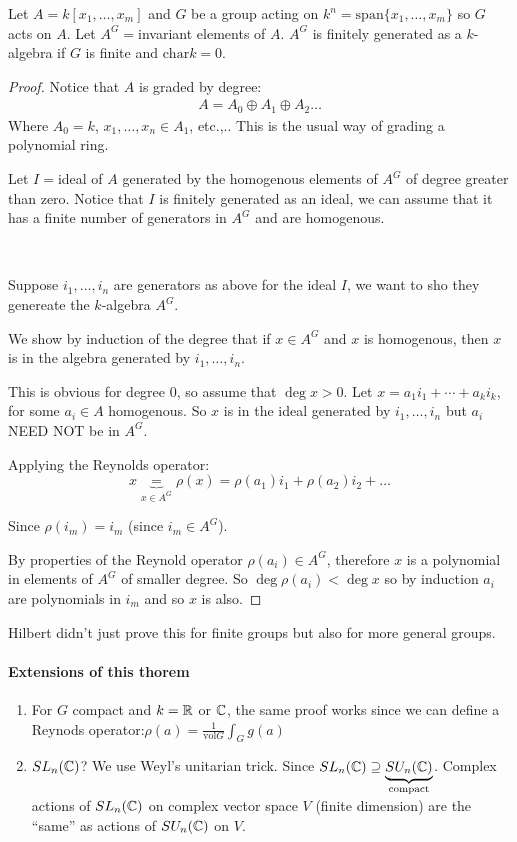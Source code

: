 \begin{theorem}
    Let $A = k[x_1,\dots,x_m]$ and $G$ be a group acting on $k^n =\text{span}\{x_1,\dots,x_m\}$ so $G$ acts on $A$. Let $A^G = $invariant elements of $A$.
    $A^G$ is finitely generated as a $k$-algebra if $G$ is finite and $\text{char} k = 0$.
    
    \begin{proof}
        Notice that $A$ is graded by degree:\begin{eqnarray}
            A = A_0\oplus A_1\oplus A_2\dots
        \end{eqnarray}
        Where $A_0 = k$, $x_1,\dots,x_n\in A_1$, etc.,.. This is the usual way of grading a polynomial ring.

        Let $I = $ideal of $A$ generated by the homogenous elements of $A^G$ of degree greater than zero. Notice that $I$ is finitely generated as an ideal, we can assume that it has a finite number of generators in $A^G$ and are homogenous.

        \

        Suppose $i_1,\dots,i_n$ are generators as above for the ideal $I$, we want to sho they genereate the $k$-algebra $A^G$. 

        We show by induction of the degree that if $x\in A^G$ and $x$ is homogenous, then $x$ is in the algebra generated by $i_1,\dots,i_n$. 
        
        This is obvious for degree $0$, so assume that $\deg x>0$. Let $x=a_1i_1+\cdots+{a_k}{i_k}$, for some $a_i\in A$ homogenous. So $x$ is in the ideal generated by $i_1,\ldots,i_n$ but $a_i$ NEED NOT be in $A^G$.

        Applying the Reynolds operator:\[x \underbrace{=}_{x\in A^G} \rho(x) = \rho(a_1)i_1+\rho(a_2)i_2+\ldots\] 
        
        Since $\rho(i_m) = i_m$ (since $i_m\in A^G$).
        


        By properties of the Reynold operator $\rho(a_i)\in A^G$, therefore $x$ is a polynomial in elements of $A^G$ of smaller degree. So $\deg \rho(a_i)<\deg x$ so by induction $a_i$ are polynomials in $i_m$ and so $x$ is also.
    \end{proof}
\end{theorem}

Hilbert didn't just prove this for finite groups but also for more general groups.

\paragraph*{Extensions of this thorem}\begin{enumerate}
    \item For $G$ compact and $k=\mathbb{R}$ or $\mathbb{C}$, the same proof works since we can define a Reynods operator:$\rho(a) = \frac{1}{\text{vol}G}\int_Gg(a)$
    \item $SL_n(\mathbb{C})$? We use Weyl's unitarian trick. Since $SL_n(\mathbb{C})\supseteq \underbrace{SU_n(\mathbb{C})}_{\text{compact}}$. Complex actions of $SL_n(\mathbb{C})$ on complex vector space $V$ (finite dimension) are the ``same'' as actions of $SU_n(\mathbb{C})$ on $V$.
\end{enumerate}



